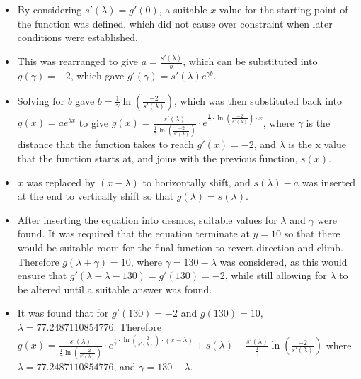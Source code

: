 \documentclass[11pt, letterpaper]{article}
\begin{document}
\begin{itemize}
	\item By considering $s'(\lambda)=g'(0)$, a suitable $x$ value for the starting point of the function was defined, which did not cause over constraint when later conditions were established. 
	\item This was rearranged to give $a=\frac{s'(\lambda)}{b}$, which can be substituted into $g(\gamma)=-2$, which gave $g'(\gamma)=s'(\lambda)e^{\gamma b}$.
		\item Solving for $b$ gave $b=\frac{1}{\gamma}\ln(\frac{-2}{s'(\lambda)})$, which was then substituted back into $g(x)=ae^{bx}$ to give $g(x)=\frac{s'(\lambda)}{\frac{1}{\gamma}\ln(\frac{-2}{s'(\lambda)})}\cdot e^{\frac{1}{\gamma}\cdot \ln (\frac{-2}{s'(\lambda)})\cdot x}$, where $\gamma$ is the distance that the function takes to reach $g'(x)=-2$, and $\lambda$ is the x value that the function starts at, and joins with the previous function, $s(x)$.
		
		\item $x$ was replaced by $(x-\lambda)$ to horizontally shift, and $s(\lambda)-a$ was inserted at the end to vertically shift so that $g(\lambda)=s(\lambda)$.
		
		\item After inserting the equation into desmos, suitable values for $\lambda$ and $\gamma$ were found. It was required that the equation terminate at $y=10$ so that there would be suitable room for the final function to revert direction and climb. Therefore $g(\lambda + \gamma)=10$, where $\gamma=130-\lambda$ was considered, as this would ensure that $g'(\lambda-\lambda-130)=g'(130)=-2$, while still allowing for $\lambda$ to be altered until a suitable answer was found.
		
		\item It was found that for $g'(130)=-2$ and $g(130)=10$, $\lambda=77.2487110854776$. Therefore $g(x)=\frac{s'(\lambda)}{\frac{1}{\gamma}\ln(\frac{-2}{s'(\lambda)})}\cdot e^{\frac{1}{\gamma}\cdot \ln (\frac{-2}{s'(\lambda)})\cdot (x-\lambda)}+s\left(\lambda\right)-\frac{s'(\lambda)}{\frac{1}{\gamma}}\ln\left(\frac{-2}{s'\left(\lambda\right)}\right)$ where $\lambda=77.2487110854776$, and $\gamma=130-\lambda$.
\end{itemize}
\end{document}
